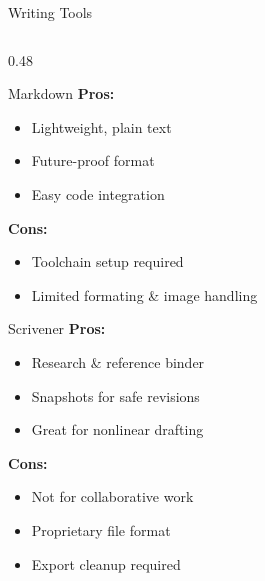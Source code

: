 \documentclass{beamer}
\begin{document}
\begin{frame}{Writing Tools}
\begin{columns}[t]
        \begin{column}{0.48\textwidth}
            \begin{block}{Markdown}
                \textbf{Pros:}
                \begin{itemize}
                    \item Lightweight, plain text
                    \item Future-proof format
                    \item Easy code integration
                \end{itemize}
                \textbf{Cons:}
                \begin{itemize}
                    \item Toolchain setup required
                    \item Limited formating \& image handling
                \end{itemize}
            \end{block}

            \begin{block}{Scrivener}
                \textbf{Pros:}
                \begin{itemize}
                    \item Research \& reference binder
                    \item Snapshots for safe revisions
                    \item Great for nonlinear drafting
                \end{itemize}
                \textbf{Cons:}
                \begin{itemize}
                    \item Not for collaborative work
                    \item Proprietary file format
                    \item Export cleanup required
                \end{itemize}
            \end{block}
        \end{column}
    \end{columns}
\end{frame}
\end{document}
